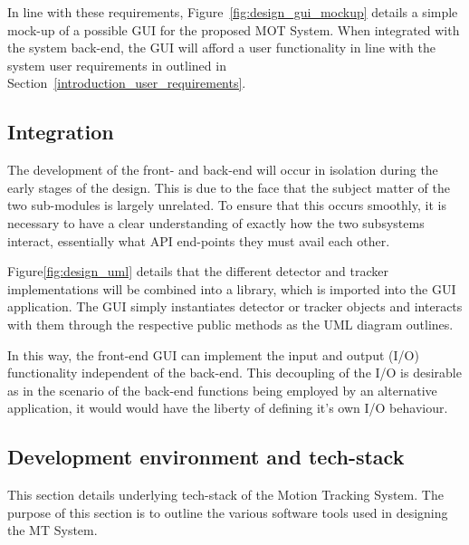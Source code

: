 In line with these requirements, Figure~\ref{fig:design_gui_mockup} details a
simple mock-up of a possible GUI for the proposed MOT System. When integrated
with the system back-end, the GUI will afford a user functionality in
line with the system user requirements in outlined in
Section~\ref{introduction_user_requirements}.


\subsection{Integration}
The development of the front- and back-end will occur in isolation during the
early stages of the design. This is due to the face that the subject matter of
the two sub-modules is largely unrelated. To ensure that this occurs smoothly,
it is necessary to have a clear understanding of exactly how the two subsystems
interact, essentially what API end-points they must avail each other.

Figure\ref{fig:design_uml} details that the different detector and tracker
implementations will be combined into a library, which is imported into the GUI
application.
The GUI simply instantiates detector or tracker objects and interacts with them
through the respective public methods as the UML diagram outlines.

In this way, the front-end GUI can implement the input and output (I/O) functionality
independent of the back-end. This decoupling of the I/O is desirable as in the
scenario of the back-end functions being employed by an alternative application,
it would would have the liberty of defining it's own I/O behaviour. 

\subsection{Development environment and tech-stack}
This section details underlying tech-stack of the Motion Tracking System. The
purpose of this section is to outline the various software tools used in
designing the MT System.


